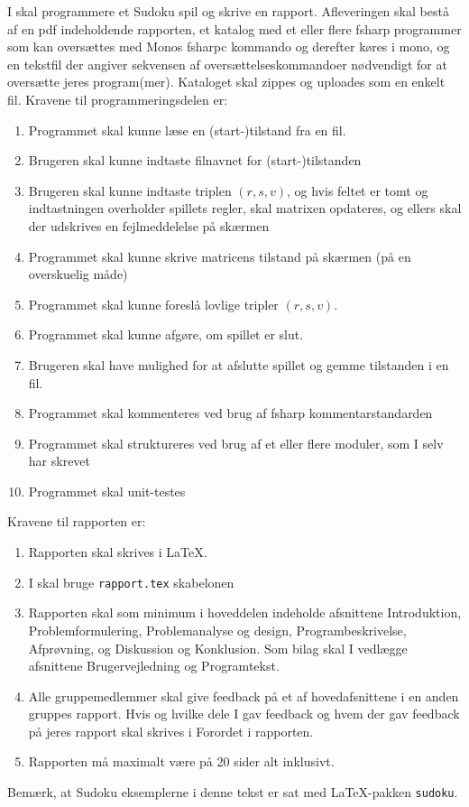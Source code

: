 I skal programmere et Sudoku spil og skrive en rapport. Afleveringen skal bestå af en pdf indeholdende rapporten, et katalog med et eller flere fsharp programmer som kan oversættes med Monos fsharpc kommando og derefter køres i mono, og en tekstfil der angiver sekvensen af oversættelseskommandoer nødvendigt for at oversætte jeres program(mer). Kataloget skal zippes og uploades som en enkelt fil. Kravene til programmeringsdelen er:
\begin{enumerate}
\item Programmet skal kunne læse en (start-)tilstand fra en fil.
\item Brugeren skal kunne indtaste filnavnet for (start-)tilstanden
\item Brugeren skal kunne indtaste triplen $(r,s,v)$, og hvis feltet er tomt og indtastningen overholder spillets regler, skal matrixen opdateres, og ellers skal der udskrives en fejlmeddelelse på skærmen
\item Programmet skal kunne skrive matricens tilstand på skærmen (på en overskuelig måde)
\item Programmet skal kunne foreslå lovlige tripler $(r,s,v)$.
\item Programmet skal kunne afgøre, om spillet er slut.
\item Brugeren skal have mulighed for at afslutte spillet og gemme tilstanden i en fil.
\item Programmet skal kommenteres ved brug af fsharp kommentarstandarden
\item Programmet skal struktureres ved brug af et eller flere moduler, som I selv har skrevet
\item Programmet skal unit-testes
\end{enumerate}
Kravene til rapporten er:
\begin{enumerate}[resume]
\item Rapporten skal skrives i \LaTeX.
\item I skal bruge \texttt{rapport.tex} skabelonen
\item Rapporten skal som minimum i hoveddelen indeholde afsnittene Introduktion, Problemformulering, Problemanalyse og design, Programbeskrivelse, Afprøvning, og Diskussion og Konklusion. Som bilag skal I vedlægge afsnittene Brugervejledning og Programtekst.
\item Alle gruppemedlemmer skal give feedback på et af hovedafsnittene i en anden gruppes rapport. Hvis og hvilke dele I gav feedback og hvem der gav feedback på jeres rapport skal skrives i Forordet i rapporten.
\item Rapporten må maximalt være på 20 sider alt inklusivt.
\end{enumerate}
Bemærk, at Sudoku eksemplerne i denne tekst er sat med \LaTeX-pakken \texttt{sudoku}.
